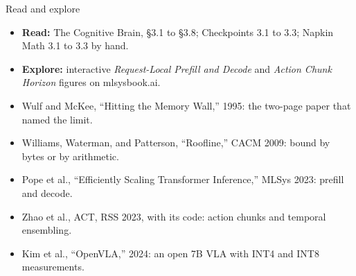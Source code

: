 \documentclass[aspectratio=169, 12pt]{beamer}
\begin{document}
\begin{frame}{Read and explore}
  \footnotesize
  \begin{itemize}\setlength{\itemsep}{0.05cm}
    \item \textbf{Read:} The Cognitive Brain, \S3.1 to \S3.8; Checkpoints 3.1 to 3.3; Napkin Math 3.1 to 3.3 by hand.
    \item \textbf{Explore:} interactive \emph{Request-Local Prefill and Decode} and \emph{Action Chunk Horizon} figures on mlsysbook.ai.
    \item Wulf and McKee, ``Hitting the Memory Wall,'' 1995: the two-page paper that named the limit.
    \item Williams, Waterman, and Patterson, ``Roofline,'' CACM 2009: bound by bytes or by arithmetic.
    \item Pope et al., ``Efficiently Scaling Transformer Inference,'' MLSys 2023: prefill and decode.
    \item Zhao et al., ACT, RSS 2023, with its code: action chunks and temporal ensembling.
    \item Kim et al., ``OpenVLA,'' 2024: an open 7B VLA with INT4 and INT8 measurements.
  \end{itemize}
\end{frame}
\end{document}
